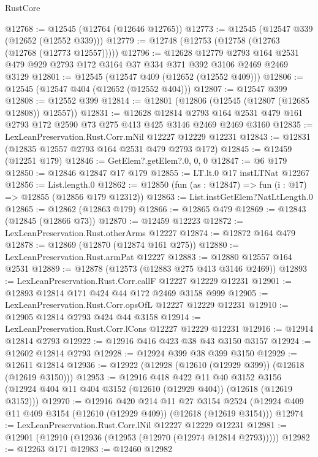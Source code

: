 \begin{lexlean}{RustCore}
\begin{coremodule}
@12768 := @12545 (@12764 (@12646 @12765))
@12773 := @12545 (@12547 @339 (@12652 (@12552 @339)))
@12779 := @12748 (@12753 (@12758 (@12763 (@12768 (@12773 @12557)))))
@12796 := @12628
    @12779
    @2793
    @164
    @2531
    @479
    @929
    @2793
    @172
    @3164
    @37
    @334
    @371
    @392
    @3106
    @2469
    @2469
    @3129
@12801 := @12545 (@12547 @409 (@12652 (@12552 @409)))
@12806 := @12545 (@12547 @404 (@12652 (@12552 @404)))
@12807 := @12547 @399
@12808 := @12552 @399
@12814 := @12801 (@12806 (@12545 (@12807 (@12685 @12808)) @12557))
@12831 := @12628
    @12814
    @2793
    @164
    @2531
    @479
    @161
    @2793
    @172
    @2590
    @73
    @275
    @413
    @425
    @3146
    @2469
    @2469
    @3160
@12835 := LexLeanPreservation.Rust.Corr.mNil @12227 @12229 @12231
@12843 := @12831 (@12835 @12557 @2793 @164 @2531 @479 @2793 @172)
@12845 := @12459 (@12251 @179)
@12846 := GetElem?.getElem?.{0, 0, 0}
@12847 := @6 @179
@12850 := @12846 @12847 @17 @179
@12855 := LT.lt.{0} @17 instLTNat @12267
@12856 := List.length.{0}
@12862 := @12850 (fun (as : @12847) => fun (i : @17) => @12855 (@12856 @179 @12312))
@12863 := List.instGetElem?NatLtLength.{0}
@12865 := @12862 (@12863 @179)
@12866 := @12865 @479
@12869 := @12843 (@12845 (@12866 @73))
@12870 := @12459 @12223
@12872 := LexLeanPreservation.Rust.otherArms @12227
@12874 := @12872 @164 @479
@12878 := @12869 (@12870 (@12874 @161 @275))
@12880 := LexLeanPreservation.Rust.armPat @12227
@12883 := @12880 @12557 @164 @2531
@12889 := @12878 (@12573 (@12883 @275 @413 @3146 @2469))
@12893 := LexLeanPreservation.Rust.Corr.callF @12227 @12229 @12231
@12901 := @12893 @12814 @171 @424 @44 @172 @2469 @3158 @999
@12905 := LexLeanPreservation.Rust.Corr.opsOfL @12227 @12229 @12231
@12910 := @12905 @12814 @2793 @424 @44 @3158
@12914 := LexLeanPreservation.Rust.Corr.lCons @12227 @12229 @12231
@12916 := @12914 @12814 @2793
@12922 := @12916 @416 @423 @38 @43 @3150 @3157
@12924 := @12602 @12814 @2793
@12928 := @12924 @399 @38 @399 @3150
@12929 := @12611 @12814
@12936 := @12922 (@12928 (@12610 (@12929 @399)) (@12618 (@12619 @3150)))
@12953 := @12916
    @418
    @422
    @11
    @40
    @3152
    @3156
    (@12924 @404 @11 @404 @3152 (@12610 (@12929 @404)) (@12618 (@12619 @3152)))
@12970 := @12916
    @420
    @214
    @11
    @27
    @3154
    @2524
    (@12924 @409 @11 @409 @3154 (@12610 (@12929 @409)) (@12618 (@12619 @3154)))
@12974 := LexLeanPreservation.Rust.Corr.lNil @12227 @12229 @12231
@12981 := @12901 (@12910 (@12936 (@12953 (@12970 (@12974 @12814 @2793)))))
@12982 := @12263 @171
@12983 := @12460 @12982

\end{coremodule}
\end{lexlean}
